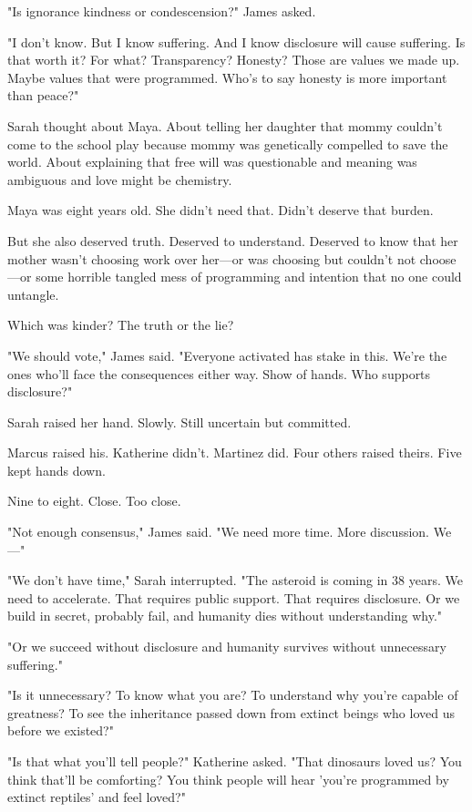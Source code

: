 "Is ignorance kindness or condescension?" James asked.

"I don't know. But I know suffering. And I know disclosure will cause suffering. Is that worth it? For what? Transparency? Honesty? Those are values we made up. Maybe values that were programmed. Who's to say honesty is more important than peace?"

Sarah thought about Maya. About telling her daughter that mommy couldn't come to the school play because mommy was genetically compelled to save the world. About explaining that free will was questionable and meaning was ambiguous and love might be chemistry.

Maya was eight years old. She didn't need that. Didn't deserve that burden.

But she also deserved truth. Deserved to understand. Deserved to know that her mother wasn't choosing work over her—or was choosing but couldn't not choose—or some horrible tangled mess of programming and intention that no one could untangle.

Which was kinder? The truth or the lie?

"We should vote," James said. "Everyone activated has stake in this. We're the ones who'll face the consequences either way. Show of hands. Who supports disclosure?"

Sarah raised her hand. Slowly. Still uncertain but committed.

Marcus raised his. Katherine didn't. Martinez did. Four others raised theirs. Five kept hands down.

Nine to eight. Close. Too close.

"Not enough consensus," James said. "We need more time. More discussion. We—"

"We don't have time," Sarah interrupted. "The asteroid is coming in 38 years. We need to accelerate. That requires public support. That requires disclosure. Or we build in secret, probably fail, and humanity dies without understanding why."

"Or we succeed without disclosure and humanity survives without unnecessary suffering."

"Is it unnecessary? To know what you are? To understand why you're capable of greatness? To see the inheritance passed down from extinct beings who loved us before we existed?"

"Is that what you'll tell people?" Katherine asked. "That dinosaurs loved us? You think that'll be comforting? You think people will hear 'you're programmed by extinct reptiles' and feel loved?"

